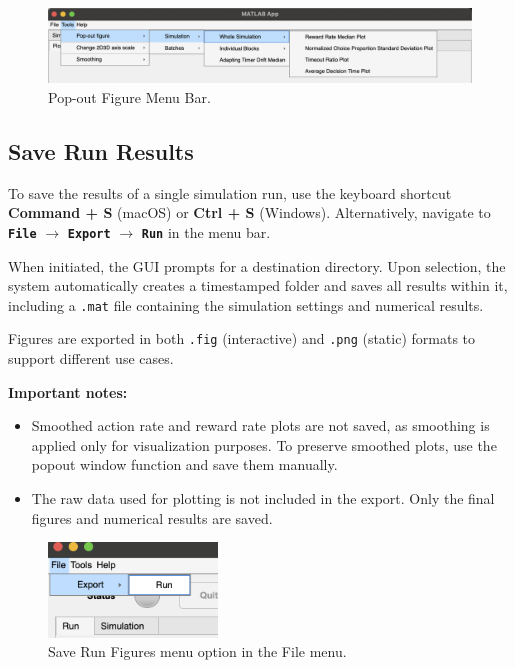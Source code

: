 \begin{figure}[H]
    \centering
    \includegraphics[width=\textwidth]{figs/popout_menu_image.png}
    \caption{Pop-out Figure Menu Bar.}
    \label{fig:popout_fig}
\end{figure}

\subsection{Save Run Results}

To save the results of a single simulation run, use the keyboard shortcut \textbf{Command + S} (macOS) or \textbf{Ctrl + S} (Windows). Alternatively, navigate to \textbf{\texttt{File}} $\rightarrow$ \textbf{\texttt{Export}} $\rightarrow$ \textbf{\texttt{Run}} in the menu bar.

When initiated, the GUI prompts for a destination directory. Upon selection, the system automatically creates a timestamped folder and saves all results within it, including a \texttt{.mat} file containing the simulation settings and numerical results.

Figures are exported in both \texttt{.fig} (interactive) and \texttt{.png} (static) formats to support different use cases.

\textbf{Important notes:}
\begin{itemize}
    \item Smoothed action rate and reward rate plots are not saved, as smoothing is applied only for visualization purposes. To preserve smoothed plots, use the popout window function and save them manually.
    
    \item The raw data used for plotting is not included in the export. Only the final figures and numerical results are saved.
\end{itemize}

\begin{figure}[H]
	\centering
	\includegraphics[width=0.4\textwidth]{figs/save_run.png}
	\caption{Save Run Figures menu option in the File menu.}
	\label{fig:save_run}
\end{figure}


